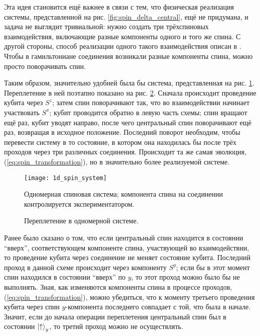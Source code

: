 \documentclass[a4paper,12pt]{article}
\theoremstyle{plain} %
\theoremstyle{definition} %
\theoremstyle{remark} %
\begin{document}
Эта идея становится ещё важнее в связи с тем, что физическая реализация системы, представленной на рис. \ref{fig:spin_delta_central}, ещё не придумана, и задача не выглядит тривиальной: нужно создать три трёхспиновых взаимодействия, включающие разные компоненты одного и того же спина. С другой стороны, способ реализации одного такого взаимодействия описан в \cite{main}. Чтобы в гамильтониане соединения возникали разные компоненты спина, можно просто поворачивать спин.

Таким образом, значительно удобней была бы система, представленная на рис. \ref{fig:1d_spin_system}. Переплетение в ней поэтапно показано на рис. \ref{fig:1d_braiding}. Сначала происходит проведение кубита через $S^z$; затем спин поворачивают так, что во взаимодействии начинает участвовать $S^x$; кубит проводится обратно в левую часть схемы; спин вращают ещё раз, кубит уводят направо, после чего центральный спин поворачивают ещё раз, возвращая в исходное положение. Последний поворот необходим, чтобы перевести систему в то состояние, в котором она находилась бы после трёх проходов через три различных соединения. Происходит та же самая эволюция, (\ref{eq:spin_transformation}), но в значительно более реализуемой системе.

\begin{figure}
    \centering
    \texttt{[image: 1d\_spin\_system]}
    \caption{Одномерная спиновая система; компонента спина на соединении контролируется экспериментатором.}
    \label{fig:1d_spin_system}
\end{figure}

\begin{figure}
    \centering
    \captionsetup[subfigure]{justification=centering}
    \caption{Переплетение в одномерной системе.}
    \label{fig:1d_braiding}
\end{figure}

Ранее было сказано о том, что если центральный спин находится в состоянии ``вверх'', соответствующем компоненте спина, участвующей во взаимодействии, то проведение кубита через соединение не меняет состояние кубита. Последний проход в данной схеме происходит через компоненту $S^y$; если бы в этот момент спин находился в состоянии ``вверх'' по $y$, то этот проход можно было бы не выполнять. Зная, как изменяются компоненты спина в процессе проходов, (\ref{eq:spin_transformation}), можно убедиться, что к моменту третьего проведения кубита через спин $y$-компонента последнего совпадает с той, что была в начале. Значит, если до начала операции переплетения центральный спин был в состоянии $\ket{\uparrow}_y$, то третий проход можно не осуществлять.
\end{document}
